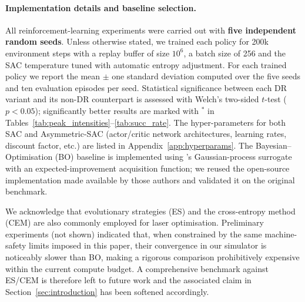 \paragraph{Implementation details and baseline selection.} All reinforcement-learning experiments were carried out with \textbf{five independent random seeds}. Unless otherwise stated, we trained each policy for 200k environment steps with a replay buffer of size $10^6$, a batch size of 256 and the SAC temperature tuned with automatic entropy adjustment. For each trained policy we report the mean \(\pm\) one standard deviation computed over the five seeds and ten evaluation episodes per seed. Statistical significance between each DR variant and its non-DR counterpart is assessed with Welch's two-sided $t$-test ($p<0.05$); significantly better results are marked with $^{\ast}$ in Tables~\ref{tab:peak_intensities}–\ref{tab:succ_rate}. The hyper-parameters for both SAC and Asymmetric-SAC (actor/critic network architectures, learning rates, discount factor, etc.) are listed in Appendix~\ref{app:hyperparams}. The Bayesian–Optimisation (BO) baseline is implemented using \citet{shalloo2020automation}'s Gaussian-process surrogate with an expected-improvement acquisition function; we reused the open-source implementation made available by those authors and validated it on the original benchmark.

We acknowledge that evolutionary strategies (ES) and the cross-entropy method (CEM) are also commonly employed for laser optimisation. Preliminary experiments (not shown) indicated that, when constrained by the same machine-safety limits imposed in this paper, their convergence in our simulator is noticeably slower than BO, making a rigorous comparison prohibitively expensive within the current compute budget. A comprehensive benchmark against ES/CEM is therefore left to future work and the associated claim in Section~\ref{sec:introduction} has been softened accordingly.

